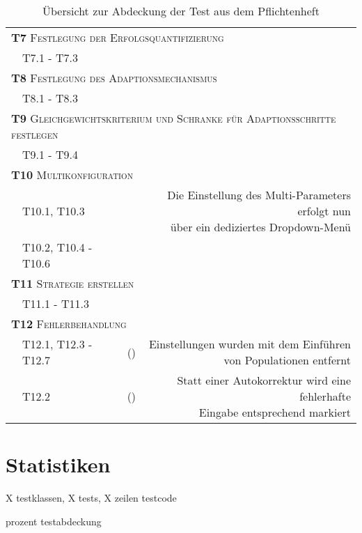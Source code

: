 \documentclass[parskip=full,11pt,openany]{scrreprt}
\newcommand{\cmark}{\ding{51}}%
\newcommand{\xmark}{\ding{55}}%
\begin{document}
\begin{table}[h]
\begin{tabular}{@{}ll|c|r@{}}
		\multicolumn{4}{l}{\small \textsc{\textbf{T7} Festlegung der Erfolgsquantifizierung}}\\ 
		&T7.1 - T7.3 & \cmark & \\
		\multicolumn{4}{l}{\small \textsc{\textbf{T8} Festlegung des Adaptionsmechanismus}}\\ 
		&T8.1 - T8.3 & \cmark & \\
		\multicolumn{4}{l}{\small \textsc{\textbf{T9} Gleichgewichtskriterium und Schranke für Adaptionsschritte festlegen}}\\ 
		&T9.1 - T9.4 & \cmark & \\
		\multicolumn{3}{l|}{\small \textsc{\textbf{T10} Multikonfiguration}}\\ 
		&T10.1, T10.3 & \cmark & \makecell{Die Einstellung des Multi-Parameters erfolgt nun\\ über ein dediziertes Dropdown-Menü}\\
		&T10.2, T10.4 - T10.6 & \cmark & \\
		\multicolumn{3}{l|}{\small \textsc{\textbf{T11} Strategie erstellen}}\\
		&T11.1 - T11.3 & \cmark & \\
		\multicolumn{3}{l|}{\small \textsc{\textbf{T12} Fehlerbehandlung}}\\ 
		&T12.1, T12.3 - T12.7 & (\xmark) & \makecell{Einstellungen wurden mit dem Einführen\\ von Populationen entfernt}\\
		&T12.2 & (\cmark) & \makecell{Statt einer Autokorrektur wird eine fehlerhafte\\ Eingabe entsprechend markiert}\\
		\bottomrule
	\end{tabular}
	\caption{Übersicht zur Abdeckung der Test aus dem Pflichtenheft}
\end{table}

\section{Statistiken}

X testklassen, X tests, X zeilen testcode

prozent testabdeckung
\end{document}
